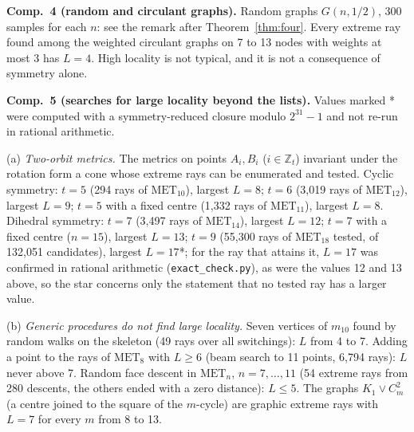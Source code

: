 \documentclass[11pt,a4paper]{article}
\theoremstyle{definition}
\theoremstyle{remark}
\newcommand{\MET}{\mathrm{MET}}
\newcommand{\Z}{\mathbb{Z}}
\newcommand{\file}[1]{\texttt{#1}}
\newcommand{\comp}[1]{\medskip\noindent\textbf{#1}}
\begin{document}
\comp{Comp.~4 (random and circulant graphs).} Random graphs $G(n, 1/2)$, 300 samples for each $n$: see the remark after
Theorem~\ref{thm:four}. Every extreme ray found among the weighted circulant graphs on 7 to 13 nodes with weights at
most 3 has $L = 4$. High locality is not typical, and it is not a consequence of symmetry alone.

\comp{Comp.~5 (searches for large locality beyond the lists).} Values marked * were computed with a symmetry-reduced
closure modulo $2^{31} - 1$ and not re-run in rational arithmetic.

(a) \emph{Two-orbit metrics.} The metrics on points $A_i, B_i$ ($i \in \Z_t$) invariant under the rotation form a
cone whose extreme rays can be enumerated and tested. Cyclic symmetry: $t = 5$ (294 rays of $\MET_{10}$), largest
$L = 8$; $t = 6$ (3,019 rays of $\MET_{12}$), largest $L = 9$; $t = 5$ with a fixed centre (1,332 rays of
$\MET_{11}$), largest $L = 8$. Dihedral symmetry: $t = 7$ (3,497 rays of $\MET_{14}$), largest $L = 12$; $t = 7$
with a fixed centre ($n = 15$), largest $L = 13$; $t = 9$ (55,300 rays of $\MET_{18}$ tested, of 132,051
candidates), largest $L = 17$*; for the ray that attains it, $L = 17$ was confirmed in rational arithmetic
(\file{exact\_check.py}), as were the values 12 and 13 above, so the star concerns only the statement that no
tested ray has a larger value.

(b) \emph{Generic procedures do not find large locality.} Seven vertices of $m_{10}$ found by random walks on the
skeleton (49 rays over all switchings): $L$ from 4 to 7. Adding a point to the rays of $\MET_8$ with $L \ge 6$ (beam
search to 11 points, 6,794 rays): $L$ never above 7. Random face descent in $\MET_n$, $n = 7, \dots, 11$ (54 extreme
rays from 280 descents, the others ended with a zero distance): $L \le 5$. The graphs $K_1 \vee C_m^2$ (a centre
joined to the square of the $m$-cycle) are graphic extreme rays with $L = 7$ for every $m$ from 8 to 13.
\end{document}
